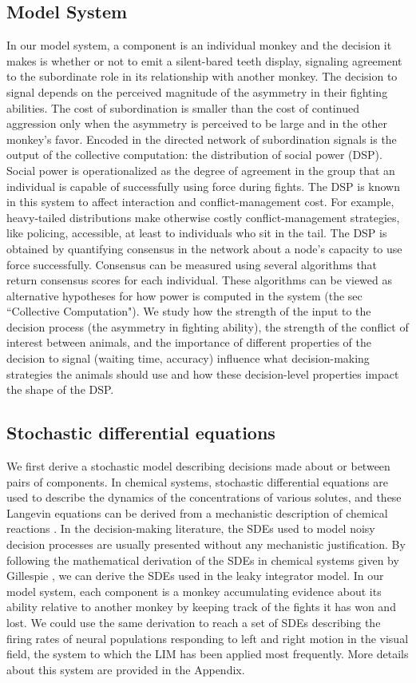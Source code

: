 \documentclass{pnastwo}
\begin{document}
\begin{article}
\subsection{Model System}
In our model system, a component is an individual monkey and the decision it makes is whether or not to emit a silent-bared teeth display, signaling agreement to the subordinate role in its relationship with another monkey. The decision to signal depends on the perceived magnitude of the asymmetry in their fighting abilities. The cost of subordination is smaller than the cost of continued aggression only when the asymmetry is perceived to be large and in the other monkey's favor. Encoded in the directed network of subordination signals is the output of the collective computation: the distribution of social power (DSP). Social power is operationalized as the degree of agreement in the group that an individual is capable of successfully using force during fights. The DSP is known in this system to affect interaction and conflict-management cost. For example, heavy-tailed distributions make otherwise costly conflict-management strategies, like policing, accessible, at least to individuals who sit in the tail. The DSP is obtained by quantifying consensus in the network about a node's capacity to use force successfully. Consensus can be measured using several algorithms that return consensus scores for each individual. These algorithms can be viewed as alternative hypotheses for how power is computed in the system (the sec ``Collective Computation"). We study how the strength of the input to the decision process (the asymmetry in fighting ability), the strength of the conflict of interest between animals,  and the importance of different properties of the decision to signal (waiting time, accuracy) influence what decision-making strategies the animals should use and how these decision-level properties impact the shape of the DSP. 


\subsection{Stochastic differential equations}    
We first derive a stochastic model describing decisions made about or between pairs of components. In chemical systems, stochastic differential equations are used to describe the dynamics of the concentrations of various solutes, and these Langevin equations can be derived from a mechanistic description of chemical reactions \cite{Gillespie:2000fk}. In the decision-making literature, the SDEs used to model noisy decision processes are usually presented without any mechanistic justification. By following the mathematical derivation of the SDEs in chemical systems given by Gillespie \cite{Gillespie:2000fk},  we can derive the SDEs used in the leaky integrator model. In our model system, each component is a monkey accumulating evidence about its ability relative to another monkey by keeping track of the fights it has won and lost. We could use the same derivation to reach a set of SDEs describing the firing rates of neural populations responding to left and right motion in the visual field, the system to which the LIM has been applied most frequently. More details about this system are provided in the Appendix. 


\end{article}
\end{document}
